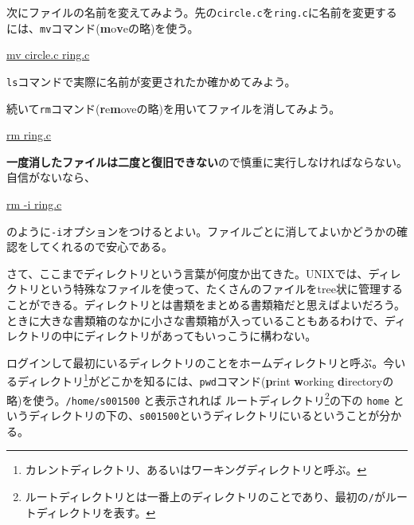 次にファイルの名前を変えてみよう。先の\texttt{circle.c}を\texttt{ring.c}に名前を変更するには、\texttt{mv}コマンド(\textbf{m}o\textbf{v}eの略)を使う。
\begin{commandline2}
    \prompt \underline{mv circle.c ring.c}
\end{commandline2} \noindent
\texttt{ls}コマンドで実際に名前が変更されたか確かめてみよう。

続いて\texttt{rm}コマンド(\textbf{r}e\textbf{m}oveの略)を用いてファイルを消してみよう。
\begin{commandline2}
    \prompt \underline{rm ring.c}
\end{commandline2} \noindent
\textbf{一度消したファイルは二度と復旧できない}ので慎重に実行しなければならない。自信がないなら、
\begin{commandline2}
    \prompt \underline{rm -i ring.c}
\end{commandline2} \noindent
のように\texttt{-i}オプションをつけるとよい。ファイルごとに消してよいかどうかの確認をしてくれるので安心である。

さて、ここまでディレクトリという言葉が何度か出てきた。UNIXでは、ディレクトリという特殊なファイルを使って、たくさんのファイルをtree状に管理することができる。ディレクトリとは書類をまとめる書類箱だと思えばよいだろう。ときに大きな書類箱のなかに小さな書類箱が入っていることもあるわけで、ディレクトリの中にディレクトリがあってもいっこうに構わない。

ログインして最初にいるディレクトリのことをホームディレクトリと呼ぶ。今いるディレクトリ\footnote{カレントディレクトリ、あるいはワーキングディレクトリと呼ぶ。}がどこかを知るには、\texttt{pwd}コマンド(\textbf{p}rint \textbf{w}orking \textbf{d}irectoryの略)を使う。\texttt{/home/s001500} と表示されれば ルートディレクトリ\footnote{ルートディレクトリとは一番上のディレクトリのことであり、最初の\texttt{/}がルートディレクトリを表す。}の下の \texttt{home} というディレクトリの下の、\texttt{s001500}というディレクトリにいるということが分かる。

